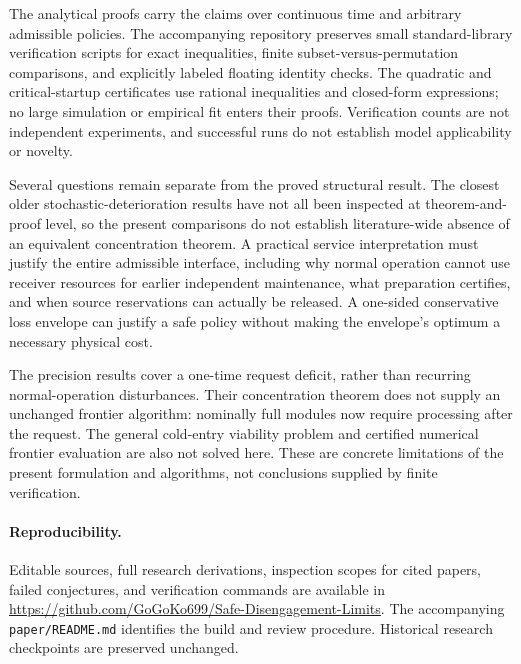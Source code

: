 \documentclass[11pt]{article}
\theoremstyle{remark}
\begin{document}
The analytical proofs carry the claims over continuous time and arbitrary
admissible policies. The accompanying repository preserves small
standard-library verification scripts for exact inequalities, finite
subset-versus-permutation comparisons, and explicitly labeled floating
identity checks. The quadratic and critical-startup certificates use rational
inequalities and closed-form expressions; no large simulation or empirical
fit enters their proofs. Verification counts are not independent experiments,
and successful runs do not establish model applicability or novelty.

Several questions remain separate from the proved structural result. The
closest older stochastic-deterioration results have not all been inspected
at theorem-and-proof level, so the present comparisons do not establish
literature-wide absence of an equivalent concentration theorem. A practical
service interpretation must justify the entire admissible interface, including
why normal operation cannot use receiver resources for earlier independent
maintenance, what preparation certifies, and when source reservations can
actually be released. A one-sided conservative loss envelope can justify a
safe policy without making the envelope's optimum a necessary physical cost.

The precision results cover a one-time request deficit, rather than recurring
normal-operation disturbances. Their concentration theorem does not supply
an unchanged frontier algorithm: nominally full modules now require processing
after the request. The general cold-entry viability problem and certified
numerical frontier evaluation are also not solved here.
These are concrete limitations of the present formulation and algorithms,
not conclusions supplied by finite verification.

\paragraph{Reproducibility.}
Editable sources, full research derivations, inspection scopes for cited
papers, failed conjectures, and verification commands are available in
\url{https://github.com/GoGoKo699/Safe-Disengagement-Limits}.
The accompanying \texttt{paper/README.md} identifies the build and review
procedure. Historical research checkpoints are preserved unchanged.



\end{document}
